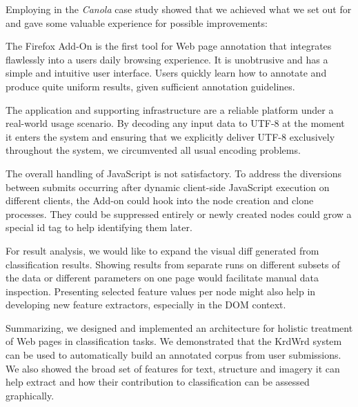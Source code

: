 Employing {\KrdWrd} in the \textit{Canola} case study showed that we achieved what we set out for and gave some valuable experience for possible improvements:

The {\KrdWrd} Firefox Add-On is the first tool for Web page annotation that integrates flawlessly into a users daily browsing experience.
It is unobtrusive and has a simple and intuitive user interface.
Users quickly learn how to annotate and produce quite uniform results, given sufficient annotation guidelines.

The {\KrdWrd} application and supporting infrastructure are a reliable platform under a real-world usage scenario.
By decoding any input data to UTF-8 at the moment it enters the system and ensuring that we explicitly deliver UTF-8 exclusively throughout the system, we circumvented all usual encoding problems.


The overall handling of JavaScript is not satisfactory.
To address the diversions between submits occurring after dynamic client-side JavaScript execution on different clients, the Add-on could hook into the node creation and clone processes.
They could be suppressed entirely or newly created nodes could grow a special id tag to help identifying them later.

For result analysis, we would like to expand the visual diff generated from classification results.
Showing results from separate runs on different subsets of the data or different parameters on one page would facilitate manual data inspection.
Presenting selected feature values per node might also help in developing new feature extractors, especially in the DOM context.


Summarizing, we designed and implemented an architecture for holistic treatment of Web pages in classification tasks.
We demonstrated that the KrdWrd system can be used to automatically build an annotated corpus from user submissions.
We also showed the broad set of features for text, structure and imagery it can help extract and how their contribution to classification can be assessed graphically.

\review{

}

